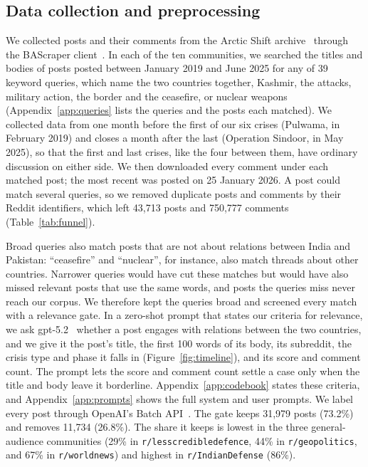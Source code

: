 \subsection{Data collection and preprocessing}

We collected posts and their comments from the Arctic Shift archive~\cite{arcticshift2026software} through the BAScraper client~\cite{bascraper2026software}. In each of the ten communities, we searched the titles and bodies of posts posted between January 2019 and June 2025 for any of 39 keyword queries, which name the two countries together, Kashmir, the attacks, military action, the border and the ceasefire, or nuclear weapons (Appendix~\ref{app:queries} lists the queries and the posts each matched). We collected data from one month before the first of our six crises (Pulwama, in February 2019) and closes a month after the last (Operation Sindoor, in May 2025), so that the first and last crises, like the four between them, have ordinary discussion on either side. We then downloaded every comment under each matched post; the most recent was posted on 25 January 2026. A post could match several queries, so we removed duplicate posts and comments by their Reddit identifiers, which left 43,713 posts and 750,777 comments (Table~\ref{tab:funnel}).

Broad queries also match posts that are not about relations between India and Pakistan: ``ceasefire'' and ``nuclear'', for instance, also match threads about other countries. Narrower queries would have cut these matches but would have also missed relevant posts that use the same words, and posts the queries miss never reach our corpus. We therefore kept the queries broad and screened every match with a relevance gate. In a zero-shot prompt that states our criteria for relevance, we ask gpt-5.2~\cite{openai2025gpt52} whether a post engages with relations between the two countries, and we give it the post's title, the first 100 words of its body, its subreddit, the crisis type and phase it falls in (Figure~\ref{fig:timeline}), and its score and comment count. The prompt lets the score and comment count settle a case only when the title and body leave it borderline. Appendix~\ref{app:codebook} states these criteria, and Appendix~\ref{app:prompts} shows the full system and user prompts. We label every post through OpenAI's Batch API~\cite{openai2026batchapi}. The gate keeps 31,979 posts (73.2\%) and removes 11,734 (26.8\%). The share it keeps is lowest in the three general-audience communities (29\% in \texttt{r/lesscredibledefence}, 44\% in \texttt{r/geopolitics}, and 67\% in \texttt{r/worldnews}) and highest in \texttt{r/IndianDefense} (86\%).

